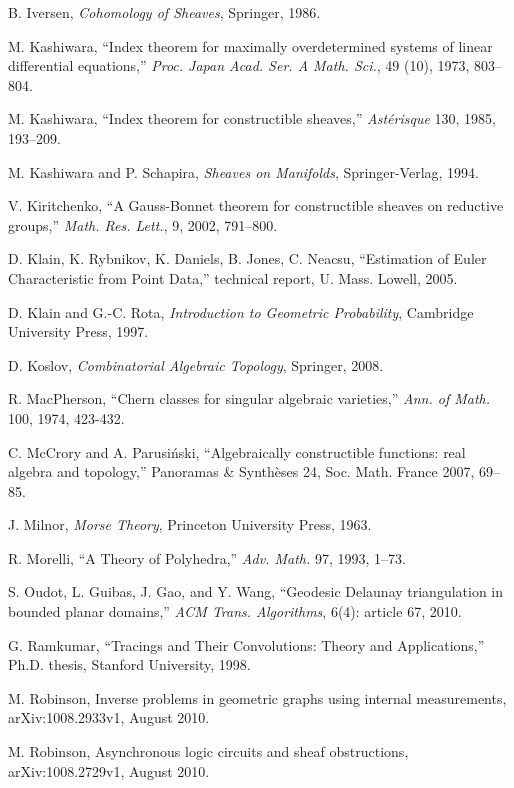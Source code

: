 \documentclass{psapm-l}
\theoremstyle{definition}
\theoremstyle{remark}
\numberwithin{equation}{section}
\begin{document}
{\begin{thebibliography}{A}
 B. Iversen, {\em Cohomology of Sheaves}, Springer, 1986.

 M. Kashiwara, ``Index theorem for maximally overdetermined systems of linear differential equations,'' {\em Proc. Japan Acad. Ser. A Math. Sci.}, 49 (10), 1973, 803--804.

 M. Kashiwara, ``Index theorem for constructible sheaves,'' {\em Ast\'erisque} 130, 1985, 193--209.

 M. Kashiwara and P. Schapira, {\em Sheaves on Manifolds}, Springer-Verlag, 1994.

 V. Kiritchenko, ``A Gauss-Bonnet theorem for constructible sheaves on reductive groups,'' {\em Math. Res. Lett.}, 9, 2002, 791--800.

 D. Klain, K. Rybnikov, K. Daniels, B. Jones, C. Neacsu, ``Estimation of Euler Characteristic from Point Data,'' technical report, U. Mass. Lowell, 2005.

 D. Klain and G.-C. Rota, {\em Introduction to Geometric Probability}, Cambridge University Press, 1997.

 D. Koslov, {\em Combinatorial Algebraic Topology}, Springer, 2008.

 R. MacPherson, ``Chern classes for singular algebraic varieties,'' {\em Ann. of Math.} 100, 1974, 423-432.

 C. McCrory and A. Parusi\'nski, ``Algebraically constructible functions: real algebra and topology,'' Panoramas \& Synth\`eses 24, Soc. Math. France 2007, 69--85.

 J. Milnor, {\em Morse Theory}, Princeton University Press, 1963.

 R. Morelli, ``A Theory of Polyhedra,'' {\em Adv. Math.} 97, 1993, 1--73.

 S. Oudot, L. Guibas, J. Gao, and Y. Wang, ``Geodesic Delaunay triangulation in bounded planar domains,'' {\em ACM Trans. Algorithms}, 6(4): article 67, 2010.

 G. Ramkumar, ``Tracings and Their Convolutions: Theory and Applications,'' Ph.D. thesis, Stanford University, 1998.

 M. Robinson, Inverse problems in geometric graphs using internal measurements, arXiv:1008.2933v1, August 2010.

 M. Robinson, Asynchronous logic circuits and sheaf obstructions, arXiv:1008.2729v1, August 2010.


\end{thebibliography}}
\end{document}
